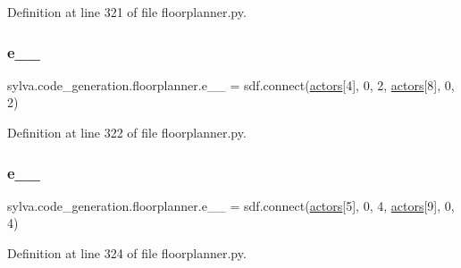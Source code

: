 Definition at line 321 of file floorplanner.\+py.

\mbox{\label{namespacesylva_1_1code__generation_1_1floorplanner_ae4f52b5f13c1bde922a2266b6be76c8f}} 
\subsubsection{\texorpdfstring{e\+\_\+\_}{e\_4\_8}}
{\footnotesize\ttfamily sylva.\+code\+\_\+generation.\+floorplanner.\+e\+\_\+\_ = sdf.\+connect(\hyperlink{namespacesylva_1_1code__generation_1_1floorplanner_a0a7a26c9bd92be126f3b70c232ba81cd}{actors}\mbox{[}4\mbox{]}, 0, 2, \hyperlink{namespacesylva_1_1code__generation_1_1floorplanner_a0a7a26c9bd92be126f3b70c232ba81cd}{actors}\mbox{[}8\mbox{]}, 0, 2)}



Definition at line 322 of file floorplanner.\+py.

\mbox{\label{namespacesylva_1_1code__generation_1_1floorplanner_aa5c423182eb48a91b11c8a75e2e3feca}} 
\subsubsection{\texorpdfstring{e\+\_\+\_}{e\_5\_9}}
{\footnotesize\ttfamily sylva.\+code\+\_\+generation.\+floorplanner.\+e\+\_\+\_ = sdf.\+connect(\hyperlink{namespacesylva_1_1code__generation_1_1floorplanner_a0a7a26c9bd92be126f3b70c232ba81cd}{actors}\mbox{[}5\mbox{]}, 0, 4, \hyperlink{namespacesylva_1_1code__generation_1_1floorplanner_a0a7a26c9bd92be126f3b70c232ba81cd}{actors}\mbox{[}9\mbox{]}, 0, 4)}



Definition at line 324 of file floorplanner.\+py.

\mbox{\label{namespacesylva_1_1code__generation_1_1floorplanner_a08287bcf4aa41708eff03ee9677bb74e}} 

